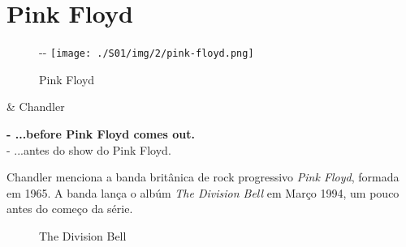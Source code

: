 \hypertarget{pink-floyd}{%
\section{Pink Floyd}\label{pink-floyd}}

\begin{figure}[!ht]
  \begin{adjustwidth}{-\oddsidemargin-1in}{-\rightmargin}
    \centering
    \texttt{[image: ./S01/img/2/pink-floyd.png]}
    \caption{Pink Floyd\label{fig:pink-floyd}}
  \end{adjustwidth}
\end{figure}

\begin{tcolorbox}[enhanced,center upper,
    drop fuzzy shadow southeast, boxrule=0.3pt,
    lower separated=false,
    colframe=black!30!dialogoBorder,colback=white]
\begin{minipage}[c]{0.16\linewidth}
   & \centering \scriptsize{Chandler}
\end{minipage}
\hfill
\begin{minipage}[c]{0.8\linewidth}
  \textbf{- ...before Pink Floyd comes out.}\\
  - ...antes do show do Pink Floyd.
\end{minipage}
\end{tcolorbox}

Chandler menciona a banda britânica de rock progressivo \emph{Pink
Floyd}, formada em 1965. A banda lança o albúm \emph{The Division Bell}
em Março 1994, um pouco antes do começo da série.

\begin{figure}
  \centering
    \caption{The Division Bell\label{fig:the-division-bell}}
\end{figure}

